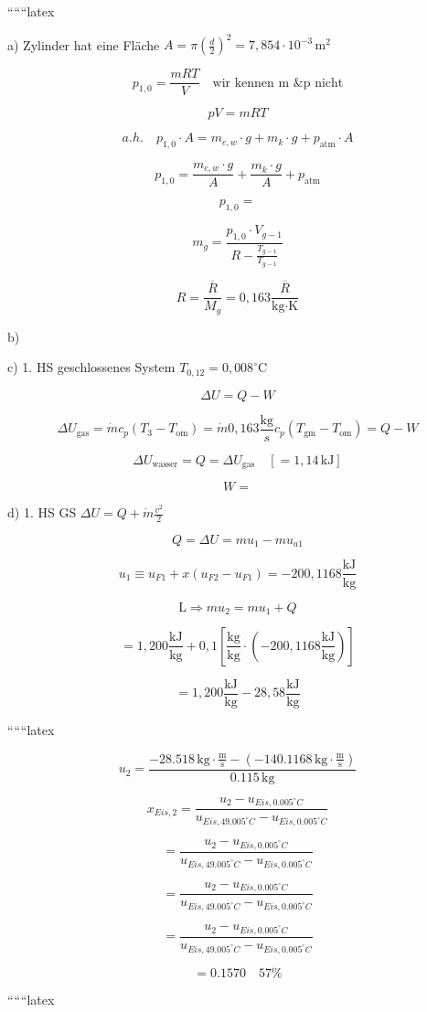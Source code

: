 
``````latex


a) Zylinder hat eine Fläche $A = \pi \left( \frac{d}{2} \right)^2 = 7,854 \cdot 10^{-3} \, \text{m}^2$

\[
p_{1,0} = \frac{mRT}{V} \quad \text{wir kennen m \& p nicht}
\]

\[
pV = mRT
\]

\[
a.h. \quad p_{1,0} \cdot A = m_{e,w} \cdot g + m_{k} \cdot g + p_{\text{atm}} \cdot A
\]

\[
p_{1,0} = \frac{m_{e,w} \cdot g}{A} + \frac{m_{k} \cdot g}{A} + p_{\text{atm}}
\]

\[
p_{1,0} = 
\]

\[
m_{g} = \frac{p_{1,0} \cdot V_{g-1}}{R - \frac{T_{g-1}}{T_{g-1}}}
\]

\[
R = \frac{\overline{R}}{M_{g}} = 0,163 \frac{\overline{R}}{\text{kg} \cdot \text{K}}
\]

b)

c) 1. HS geschlossenes System $T_{0,12} = 0,008^\circ \text{C}$

\[
\Delta U = Q - W
\]

\[
\Delta U_{\text{gas}} = \dot{m} c_p (T_3 - T_{\text{om}}) = \dot{m} 0,163 \frac{\text{kg}}{s} c_p (T_{\text{gm}} - T_{\text{om}}) = Q - W
\]

\[
\Delta U_{\text{wasser}} = Q = \Delta U_{\text{gas}} \quad \left[ = 1,14 \, \text{kJ} \right]
\]

\[
W = 
\]

d) 1. HS GS $\Delta U = Q + \dot{m} \frac{v^2}{2}$

\[
Q = \Delta U = m u_{1} - m u_{a1}
\]

\[
u_{1} \equiv u_{F1} + x (u_{F2} - u_{F1}) = -200,1168 \frac{\text{kJ}}{\text{kg}}
\]

\[
\text{L} \Rightarrow m u_{2} = m u_{1} + Q
\]

\[
= 1,200 \frac{\text{kJ}}{\text{kg}} + 0,1 \left[ \frac{\text{kg}}{\text{kg}} \cdot (-200,1168 \frac{\text{kJ}}{\text{kg}}) \right]
\]

\[
= 1,200 \frac{\text{kJ}}{\text{kg}} - 28,58 \frac{\text{kJ}}{\text{kg}}
\]

``````latex


\[
u_2 = \frac{-28.518 \, \text{kg} \cdot \frac{\text{m}}{\text{s}} - (-140.1168 \, \text{kg} \cdot \frac{\text{m}}{\text{s}})}{0.115 \, \text{kg}}
\]

\[
x_{Eis,2} = \frac{u_2 - u_{Eis,0.005^\circ C}}{u_{Eis,49.005^\circ C} - u_{Eis,0.005^\circ C}}
\]

\[
= \frac{u_2 - u_{Eis,0.005^\circ C}}{u_{Eis,49.005^\circ C} - u_{Eis,0.005^\circ C}}
\]

\[
= \frac{u_2 - u_{Eis,0.005^\circ C}}{u_{Eis,49.005^\circ C} - u_{Eis,0.005^\circ C}}
\]

\[
= \frac{u_2 - u_{Eis,0.005^\circ C}}{u_{Eis,49.005^\circ C} - u_{Eis,0.005^\circ C}}
\]

\[
= 0.1570 \quad \text{57\%}
\]

``````latex


